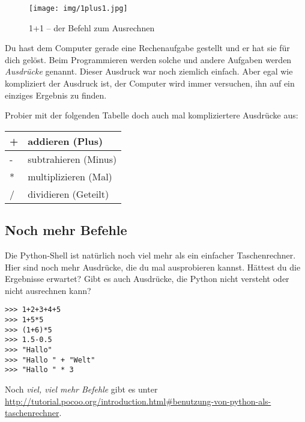 	\begin{figure}[htbp]
		\centering
		\texttt{[image: img/1plus1.jpg]}
		\caption{1+1 – der Befehl zum Ausrechnen}
		\label{1plus1}
	\end{figure}
	
	Du hast dem Computer gerade eine Rechenaufgabe gestellt und er hat sie für dich gelöst. Beim Programmieren werden solche und andere Aufgaben werden \emph{Ausdrücke} genannt. Dieser Ausdruck war noch ziemlich einfach. Aber egal wie kompliziert der Ausdruck ist, der Computer wird immer versuchen, ihn auf ein einziges Ergebnis zu finden. 
	
	Probier mit der folgenden Tabelle doch auch mal kompliziertere Ausdrücke aus:
	\begin{table}[htbp]
		\centering
		\normalsize
		\begin{tabular}{|l|l|}
			\hline
				+ & 	addieren (Plus)	\\
			\hline
				- & 	subtrahieren (Minus)\\
			\hline
				* & 	multiplizieren (Mal)\\
			\hline
				/ & 	dividieren (Geteilt)\\
			\hline
		\end{tabular}
	\end{table}
	
	\subsection*{Noch mehr Befehle}
	Die Python-Shell ist natürlich noch viel mehr als ein einfacher Taschenrechner. Hier sind noch mehr Ausdrücke, die du mal ausprobieren kannst. Hättest du die Ergebnisse erwartet? Gibt es auch Ausdrücke, die Python nicht versteht oder nicht ausrechnen kann?
	
	\begin{lstlisting}
>>> 1+2+3+4+5
>>> 1+5*5
>>> (1+6)*5
>>> 1.5-0.5
>>> "Hallo"
>>> "Hallo " + "Welt"
>>> "Hallo " * 3
	\end{lstlisting}
	
	Noch \emph{viel, viel mehr Befehle} gibt es unter \url{http://tutorial.pocoo.org/introduction.html#benutzung-von-python-als-taschenrechner}.
	

